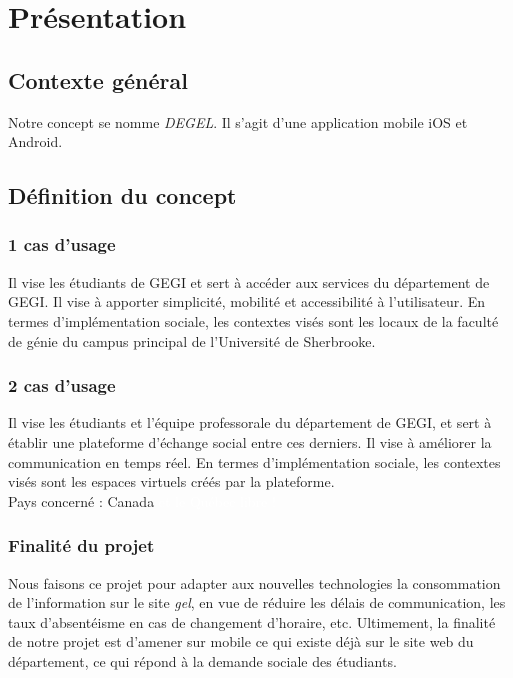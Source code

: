 \section{Présentation}
	\subsection{Contexte général}
	Notre concept se nomme \emph{DEGEL}. Il s'agit d'une application mobile iOS et Android.

	\subsection{Définition du concept}
	
		\subsubsection{1\ier{} cas d'usage} Il vise les étudiants de GEGI et sert à accéder aux services du département de GEGI. Il vise à apporter simplicité, mobilité et accessibilité à l'utilisateur. En termes d'implémentation sociale, les contextes visés sont les locaux de la faculté de génie du campus principal de l'Université de Sherbrooke.
		
		\subsubsection{2\ieme{} cas d'usage} Il vise les étudiants et l'équipe professorale du département de GEGI, et sert à établir une plateforme d'échange social entre ces derniers. Il vise à améliorer la communication en temps réel. En termes d'implémentation sociale, les contextes visés sont les espaces virtuels créés par la plateforme. \\
	
			Pays concerné : Canada \textcolor{white}{et le Québec libre !}
	
		\subsubsection{Finalité du projet}
		Nous faisons ce projet pour adapter aux nouvelles technologies la consommation de l'information sur le site \emph{gel}, en vue de réduire les délais de communication, les taux d'absentéisme en cas de changement d'horaire, etc. Ultimement, la finalité de notre projet est d'amener sur mobile ce qui existe déjà sur le site web du département, ce qui répond à la demande sociale des étudiants.
		
